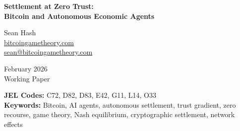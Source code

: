 \documentclass[12pt]{article}
\theoremstyle{definition}
\theoremstyle{remark}
\begin{document}

\begin{center}
{\LARGE\bfseries Settlement at Zero Trust:\\Bitcoin and Autonomous Economic Agents}

\bigskip

{\large Sean Hash}\\
\url{bitcoingametheory.com}\\
\href{mailto:sean@bitcoingametheory.com}{sean@bitcoingametheory.com}

\bigskip

February 2026\\[4pt]
{\normalsize Working Paper}

\medskip

{\small
\textbf{JEL Codes:} C72, D82, D83, E42, G11, L14, O33\\[4pt]
\textbf{Keywords:} Bitcoin, AI agents, autonomous settlement, trust gradient, zero recourse, game theory, Nash equilibrium, cryptographic settlement, network effects
}
\end{center}

\bigskip


\begin{abstract}
\noindent
As autonomous AI agents become economic actors, executing transactions
and holding assets, they face a settlement problem that human actors
prefer to solve but AI agents must solve. When a counterparty defects
against an AI agent, the agent cannot sue, cannot appeal to regulators,
and cannot retaliate through legal channels. The recourse vector is
zero. This paper formalizes the ``Trust Gradient'': the advantage of
neutral settlement over capturable settlement increases monotonically as
available legal recourse decreases. Human actors sit at various points
along this gradient; AI agents occupy the endpoint. Building on the Exit
Game (Hash, 2026a) and the axiom elimination (Hash, 2026b), we prove
that at zero recourse, Bitcoin is the uniquely rational settlement
choice --- the only mechanism that requires no trust in counterparties,
intermediaries, or legal systems. The analysis implies that AI agents
will be the fastest-adopting class of Bitcoin users, and that the
growing population of autonomous economic agents strengthens the
convergence pressure for all actors. The framework is falsifiable: if AI
agents gain legal personhood with enforceable rights, the limiting case
weakens.
\end{abstract}
\end{document}
